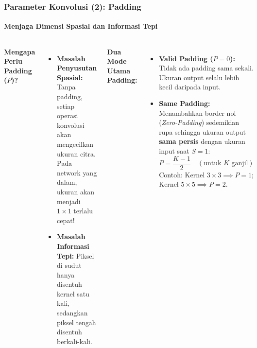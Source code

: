 \documentclass[t,aspectratio=169,xcolor=dvipsnames]{beamer}
\begin{document}
\begin{frame}
    \frametitle{Parameter Konvolusi (2): Padding}
    \framesubtitle{Menjaga Dimensi Spasial dan Informasi Tepi}
    \small

    \begin{columns}[t]
        \textbf{Mengapa Perlu Padding ($P$)?}
        \begin{itemize}
            \item \textbf{Masalah Penyusutan Spasial:} Tanpa padding, setiap operasi konvolusi akan mengecilkan ukuran citra. Pada network yang dalam, ukuran akan menjadi $1\times1$ terlalu cepat!
            \item \textbf{Masalah Informasi Tepi:} Piksel di sudut hanya disentuh kernel satu kali, sedangkan piksel tengah disentuh berkali-kali.
        \end{itemize}

        \textbf{Dua Mode Utama Padding:}
        \begin{itemize}
            \item \textbf{Valid Padding ($P=0$):}
            Tidak ada padding sama sekali. Ukuran output selalu lebih kecil daripada input.
            \item \textbf{Same Padding:}
            Menambahkan border nol (\textit{Zero-Padding}) sedemikian rupa sehingga ukuran output \textbf{sama persis} dengan ukuran input saat $S=1$:
            $$P = \frac{K - 1}{2} \quad (\text{untuk } K \text{ ganjil})$$
            Contoh: Kernel $3\times3 \implies P=1$; Kernel $5\times5 \implies P=2$.
        \end{itemize}
    \end{columns}
\end{frame}
\end{document}
